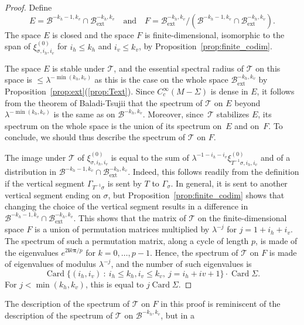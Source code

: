 \documentclass[10pt]{amsart}
\newcommand{\ext}{\mathrm{ext}}
\newcommand{\boB}{\mathcal{B}}
\newcommand{\boT}{\mathcal{T}}
\newcommand{\ic}{\mathbf{i}}
\newcommand{\bpi}{\boldsymbol{\pi}}
\newcommand{\st}{\::\:}
\DeclareMathOperator{\Card}{Card}
\theoremstyle{definition}
\numberwithin{equation}{section}
\begin{document}
\begin{proof}
Define
\[
E = \boB^{-k_h-1, k_v} \cap \boB^{-k_h, k_v}_{\ext}\quad\text{and}\quad F =
\boB_{\ext}^{-k_h, k_v}/(\boB^{-k_h-1, k_v} \cap \boB^{-k_h, k_v}_{\ext}).
\]
The
space $E$ is closed and the space $F$ is finite-dimensional, isomorphic to
the span of $\xi^{(0)}_{\sigma, i_h, i_v}$ for $i_h \leq k_h$ and $i_v\leq
k_v$, by Proposition~\ref{prop:finite_codim}.

The space $E$ is stable under $\boT$, and the essential spectral radius of
$\boT$ on this space is $\leq \lambda^{-\min(k_h, k_v)}$ as this is the case
on the whole space $\boB_{\ext}^{-k_h, k_v}$ by
Proposition~\ref{prop:ext}(\ref{prop:Text}). Since $C^\infty_c(M-\Sigma)$ is
dense in $E$, it follows from the theorem of Baladi-Tsujii that the spectrum
of $\boT$ on $E$ beyond $\lambda^{-\min(k_h, k_v)}$ is the same as on
$\boB^{-k_h, k_v}$. Moreover, since~$\boT$ stabilizes $E$, its spectrum on
the whole space is the union of its spectrum on~$E$ and on~$F$. To conclude,
we should thus describe the spectrum of $\boT$ on $F$.

The image under $\boT$ of $\xi^{(0)}_{\sigma, i_h, i_v}$ is equal to the sum
of $\lambda^{-1-i_h-i_v} \xi^{(0)}_{T^{-1}\sigma, i_h, i_v}$ and of a
distribution in $\boB^{-k_h-1, k_v} \cap \boB^{-k_h, k_v}_{\ext}$. Indeed,
this follows readily from the definition if the vertical segment
$\Gamma_{T^{-1}\sigma}$ is sent by $T$ to $\Gamma_\sigma$. In general, it is
sent to another vertical segment ending on $\sigma$, but
Proposition~\ref{prop:finite_codim} shows that changing the choice of the
vertical segment results in a difference in $\boB^{-k_h-1, k_v} \cap
\boB_{\ext}^{-k_h, k_v}$. This shows that the matrix of $\boT$ on the
finite-dimensional space $F$ is a union of permutation matrices multiplied by
$\lambda^{-j}$ for $j=1+i_h+i_v$. The spectrum of such a permutation matrix,
along a cycle of length $p$, is made of the eigenvalues $e^{2\ic k\bpi/p}$
for $k=0,\dotsc, p-1$. Hence, the spectrum of $\boT$ on $F$ is made of
eigenvalues of modulus $\lambda^{-j}$, and the number of such eigenvalues is
\begin{equation*}
\Card \{(i_h, i_v) \st i_h \leq k_h, i_v \leq k_v, \ j = i_h+iv+1\} \cdot \Card\Sigma.
\end{equation*}
For $j < \min(k_h, k_v)$, this is equal to $j \Card \Sigma$.
\end{proof}
The description of the spectrum of $\boT$ on $F$ in this proof is reminiscent
of the description of the spectrum of $\boT$ on $\boB^{-k_h, k_v}$, but in a
\end{document}
